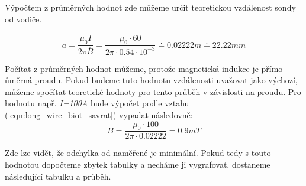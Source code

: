 \documentclass{praktikum}
\begin{document}
\indent Výpočtem z průměrných hodnot zde můžeme určit teoretickou vzdálenost sondy od vodiče.

\begin{equation}
\label{eqn:calc_singlewire_distance}
a=\frac{\mu _0\overline{I}}{2\pi\overline{B}}=\frac{\mu _0 \cdot 60}{2 \pi \cdot 0.54 \cdot 10^{-3}} \doteq 0.02222m \doteq 22.22mm
\end{equation}

\indent Počítat z průměrných hodnot můžeme, protože magnetická indukce je přímo ůměrná proudu. Pokud budeme tuto hodnotu vzdálenosti uvažovat jako výchozí, můžeme spočítat teoretické hodnoty pro tento průběh v závislosti na proudu. Pro hodnotu např. \textit{I=100A} bude výpočet podle vztahu (\ref{eqn:long_wire_biot_savrat}) vypadat následovně:
\[ B = \frac{\mu _0 \cdot 100}{2\pi \cdot 0.02222} = 0.9mT \]

\indent Zde lze vidět, že odchylka od naměřené je minimální. Pokud tedy s touto hodnotou dopočteme zbytek tabulky a necháme ji vygrafovat, dostaneme následující tabulku a průběh.
\end{document}
